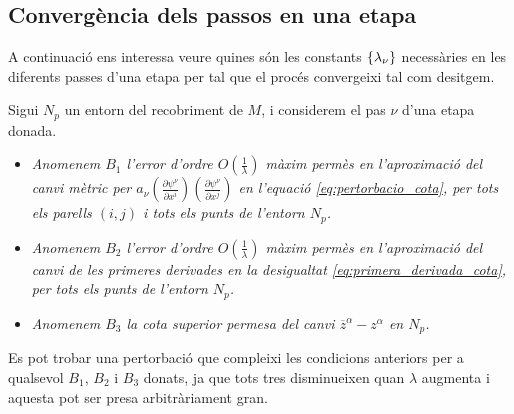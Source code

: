 \subsection{Convergència dels passos en una etapa}
A continuació ens interessa veure quines són les constants $\{\lambda_\nu\}$ necessàries en les diferents passes d'una etapa per tal que el procés convergeixi tal com desitgem.
\begin{defi}
    Sigui $N_p$ un entorn del recobriment de $M$, i considerem el pas $\nu$ d'una etapa donada.
\end{defi}
\begin{itemize}\label{def: B1 B2 B3}
    \item \textit{Anomenem $B_1$ l'error d'ordre $O\left(\frac1{\lambda}\right)$ màxim permès en l'aproximació del canvi mètric per $a_\nu\left(\frac{\partial\psi^\nu}{\partial x^i}\right)\left(\frac{\partial\psi^\nu}{\partial x^j}\right)$ en l'equació \ref{eq:pertorbacio_cota}, per tots els parells $(i,j)$ i tots els punts de l'entorn $N_p$.}
    \item \textit{Anomenem $B_2$ l'error d'ordre $O\left(\frac1{\lambda}\right)$ màxim permès en l'aproximació del canvi de les primeres derivades en la desigualtat \ref{eq:primera_derivada_cota}, per tots els punts de l'entorn $N_p$.}
    \item \textit{Anomenem $B_3$ la cota superior permesa del canvi $\overline{z}^\alpha - z^\alpha$ en $N_p$.}
\end{itemize}
\begin{obs}
    Es pot trobar una pertorbació que compleixi les condicions anteriors per a qualsevol $B_1$, $B_2$ i $B_3$ donats, ja que tots tres disminueixen quan $\lambda$ augmenta i aquesta pot ser presa arbitràriament gran.
\end{obs}

